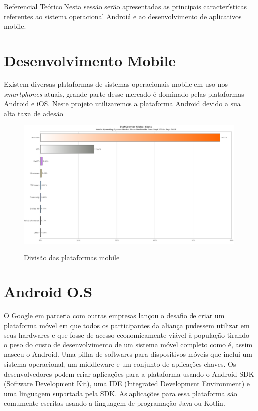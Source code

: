 \documentclass[
	12pt,				%
	openright,			%
	twoside,			%
	a4paper,			%
	english,			%
	french,				%
	spanish,			%
	brazil				%
	]{abntex2}
\begin{document}
\begin{chapter}{Referencial Teórico}
Nesta sessão serão apresentadas as principais características referentes ao sistema operacional Android e ao desenvolvimento de aplicativos mobile.

\section{Desenvolvimento Mobile}
Existem diversas plataformas de sistemas operacionais mobile em uso nos \textit{smartphones} atuais, grande parte desse mercado é dominado pelas plataformas Android e iOS. Neste projeto utilizaremos a plataforma Android devido a sua alta taxa de adesão.

\begin{figure}[h]
\centering
   \caption{Divisão das plataformas mobile}
   \includegraphics[scale=0.4]{media/grafico_plataformas.png}
     \label{fig:plataformas_mobile}
\end{figure}


\section{Android O.S}
O Google em parceria com outras empresas lançou o desafio de criar um plataforma móvel em que todos os participantes da aliança pudessem utilizar em seus hardwares e que fosse de acesso economicamente viável à população tirando o peso do custo de desenvolvimento de um sistema móvel completo como é, assim nasceu o Android. Uma pilha de softwares para dispositivos móveis que inclui um sistema operacional, um middleware e um conjunto de aplicações chaves. Os desenvolvedores podem criar aplicações para a plataforma usando o Android SDK (Software Development Kit), uma IDE (Integrated Development Environment) e uma linguagem suportada pela SDK. As aplicações para essa plataforma são comumente escritas usando a linguagem de programação Java ou Kotlin.


\end{chapter}
\end{document}
